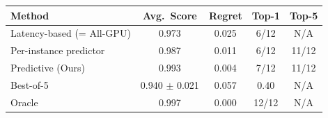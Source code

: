 \begin{tabular}{lcccc}
\toprule
Method & Avg.\ Score & Regret & Top-1 & Top-5 \\
\midrule
Latency-based (= All-GPU) & 0.973 & 0.025 & 6/12 & N/A \\
Per-instance predictor & 0.987 & 0.011 & 6/12 & 11/12 \\
Predictive (Ours) & 0.993 & 0.004 & 7/12 & 11/12 \\
Best-of-5 & 0.940 $\pm$ 0.021 & 0.057 & 0.40 & N/A \\
Oracle & 0.997 & 0.000 & 12/12 & N/A \\
\bottomrule
\end{tabular}
